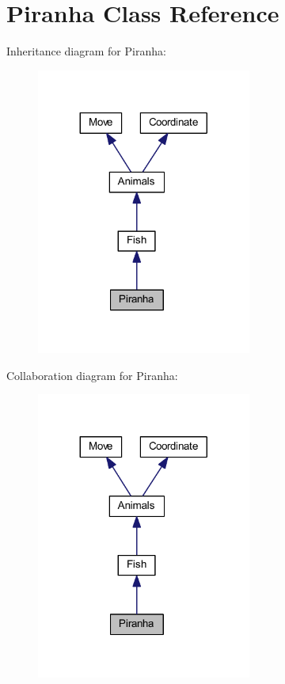 \hypertarget{class_piranha}{}\section{Piranha Class Reference}
\label{class_piranha}


Inheritance diagram for Piranha\+:
\nopagebreak
\begin{figure}[H]
\begin{center}
\leavevmode
\includegraphics[width=200pt]{class_piranha__inherit__graph}
\end{center}
\end{figure}


Collaboration diagram for Piranha\+:
\nopagebreak
\begin{figure}[H]
\begin{center}
\leavevmode
\includegraphics[width=200pt]{class_piranha__coll__graph}
\end{center}
\end{figure}
